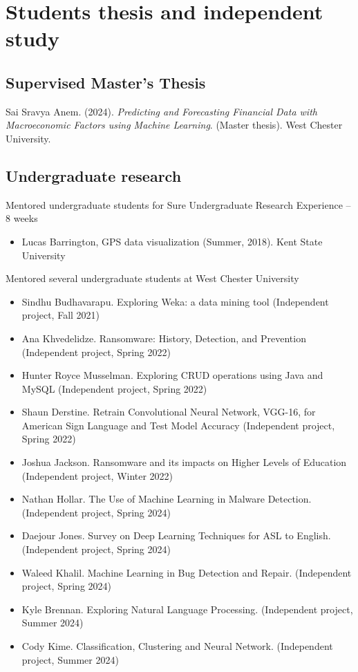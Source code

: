\documentclass{article}
\begin{document}
\section*{Students thesis and independent study}
\subsection*{Supervised Master’s Thesis}
\begin{adjustwidth}{1cm}{}
Sai Sravya Anem. (2024). \textit{Predicting and Forecasting Financial Data with Macroeconomic Factors using Machine Learning}. (Master thesis). West Chester University.
\end{adjustwidth}

\subsection*{Undergraduate research}
Mentored undergraduate students for Sure Undergraduate Research Experience – 8 weeks
\begin{itemize}
 \setlength\itemsep{-0.5em}
    \item Lucas Barrington, GPS data visualization (Summer, 2018). Kent State University 
\end{itemize}

\noindent Mentored several undergraduate students at West Chester University
\begin{itemize}
 \setlength\itemsep{-0.5em}
    \item Sindhu Budhavarapu. Exploring Weka: a data mining tool (Independent project, Fall 2021)
    \item Ana Khvedelidze. Ransomware: History, Detection, and Prevention (Independent project, Spring 2022)
    \item Hunter Royce Musselman. Exploring CRUD operations using Java and MySQL (Independent project, Spring 2022)
    \item Shaun Derstine. Retrain Convolutional Neural Network, VGG-16, for American Sign Language and Test Model Accuracy (Independent project, Spring 2022)
    \item Joshua Jackson. Ransomware and its impacts on Higher Levels of Education (Independent project, Winter 2022)
    \item Nathan Hollar. The Use of Machine Learning in Malware Detection. (Independent project, Spring 2024)
    \item Daejour Jones. Survey on Deep Learning Techniques for ASL to English. (Independent project, Spring 2024)
    \item Waleed Khalil. Machine Learning in Bug Detection and Repair. (Independent project, Spring 2024)
    \item Kyle Brennan. Exploring Natural Language Processing. (Independent project, Summer 2024)
    \item Cody Kime. Classification, Clustering and Neural Network. (Independent project, Summer 2024)
\end{itemize}
\end{document}
